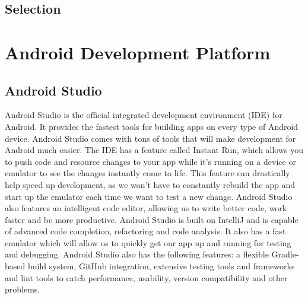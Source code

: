 \documentclass[letterpaper,10pt,draftclsnofoot,onecolumn,titlepage]{IEEEtran}
\begin{document}
	\subsection{Selection}

	\section{Android Development Platform}
		\subsection{Android Studio}
			Android Studio is the official integrated development environment (IDE) for Android.
			It provides the fastest tools for building apps on every type of Android device.
			Android Studio comes with tons of tools that will make development for Android much easier.
			The IDE has a feature called Instant Run, which allows you to push code and resource changes to your app while it's running on a device or emulator to see the changes instantly come to life.
			This feature can drastically help speed up development, as we won't have to constantly rebuild the app and start up the emulator each time we want to test a new change.
			Android Studio also features an intelligent code editor, allowing us to write better code, work faster and be more productive.
			Android Studio is built on IntelliJ and is capable of advanced code completion, refactoring and code analysis.
			It also has a fast emulator which will allow us to quickly get our app up and running for testing and debugging.
			Android Studio also has the following features: a flexible Gradle-based build system, GitHub integration, extensive testing tools and frameworks and lint tools to catch performance, usability, version compatibility and other problems.
\end{document}
